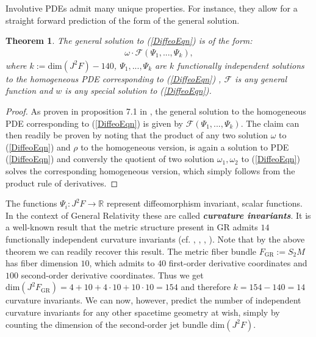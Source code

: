 \documentclass[%
 reprint,
nofootinbib,
 amsmath,amssymb,
 aps,
 prd,
floatfix,
]{revtex4-2}
\newtheorem{theorem}{Theorem}
\begin{document}
Involutive PDEs admit many unique properties. For instance, they allow for a straight forward prediction of the form of the general solution.
\begin{theorem}\label{FormalSol}
The general solution to (\ref{DiffeoEqn}) is of the form:
\begin{align}
    \omega \cdot \mathcal{F} \left (\Psi_1,...,\Psi_k \right ),
\end{align}
where $k:= \mathrm{dim}(J^2F) - 140$,  $\Psi_1,...,\Psi_k$ are $k$ functionally independent solutions to the homogeneous PDE corresponding to (\ref{DiffeoEqn}) , $\mathcal{F}$ is any general function and $w$ is any special solution to (\ref{DiffeoEqn}).
\end{theorem}
\begin{proof}
As proven in proposition 7.1 in \cite{seiler1994analysis}, the general solution to the homogeneous PDE corresponding to (\ref{DiffeoEqn}) is given by $\mathcal{F} \left (\Psi_1,...,\Psi_k \right )$. The claim can then readily be proven by noting that the product of any two solution $\omega$ to (\ref{DiffeoEqn}) and $\rho$ to the homogeneous version, is again a solution to PDE (\ref{DiffeoEqn}) and conversly the quotient of two solution $\omega_1,\omega_2$ to (\ref{DiffeoEqn}) solves the corresponding homogeneous version, which simply follows from the product rule of derivatives. \end{proof}

The functions $\Psi_i: J^2F \rightarrow \mathbb{R}$ represent diffeomorphism invariant, scalar functions. In the context of General Relativity these are called \textit{\textbf{curvature invariants}}. It is a well-known result that the metric structure present in GR admits $14$ functionally independent curvature invariants (cf. \cite{2009CQGra..26b5013C}, \cite{Zakhary1997}, \cite{2002IJMPD..11..827C}, \cite{doi:10.1063/1.531425}). 
Note that by the above theorem we can readily recover this result. The metric fiber bundle $F_{\text{GR}}:=S_2M$ has fiber dimension $10$, which admits to $40$ first-order derivative coordinates and $100$ second-order derivative coordinates. Thus we get $\mathrm{dim}(J^2F_{\text{GR}}) = 4+10+4\cdot10+10\cdot10 = 154$ and therefore $k=154-140=14$ curvature invariants. 
We can now, however, predict the number of independent curvature invariants for any other spacetime geometry at wish, simply by counting the dimension of the second-order jet bundle $\mathrm{dim}(J^2F)$.
\end{document}
